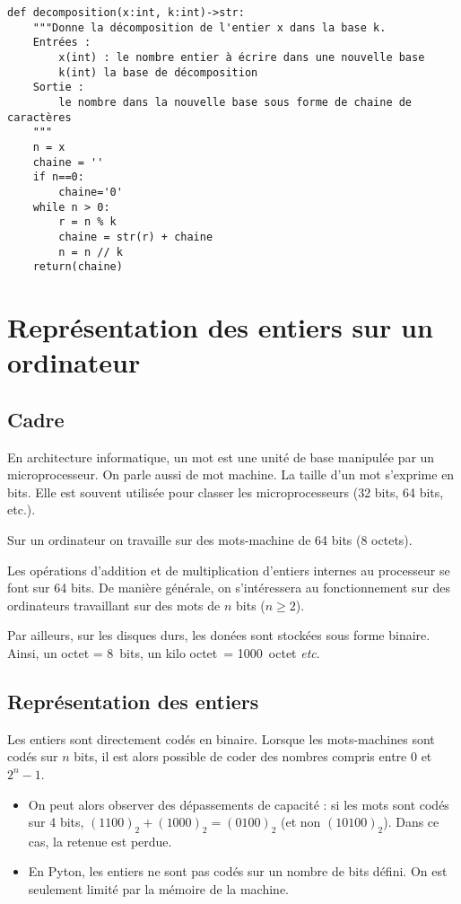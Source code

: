 \begin{lstlisting}
def decomposition(x:int, k:int)->str:
    """Donne la décomposition de l'entier x dans la base k.
    Entrées :
        x(int) : le nombre entier à écrire dans une nouvelle base
        k(int) la base de décomposition
    Sortie :
        le nombre dans la nouvelle base sous forme de chaine de caractères
    """
    n = x
    chaine = ''
    if n==0:
        chaine='0'
    while n > 0:
        r = n % k
        chaine = str(r) + chaine
        n = n // k
    return(chaine)
\end{lstlisting}

\section{Représentation des entiers sur un ordinateur}
\subsection{Cadre}
\begin{defi}
En architecture informatique, un mot est une unité de base manipulée par un microprocesseur. On parle aussi de mot machine. La taille d’un mot s’exprime en bits. Elle est souvent utilisée pour classer les microprocesseurs (32 bits, 64 bits, etc.).
\end{defi}

Sur un ordinateur on travaille sur des mots-machine de 64 bits (8 octets).

Les opérations d’addition et de multiplication d’entiers internes au processeur se font sur 64 bits.
De manière générale, on s’intéressera au fonctionnement sur des ordinateurs travaillant sur des mots de $n$ bits
($n \geq 2$).


Par ailleurs, sur les disques durs, les donées sont stockées sous forme binaire. Ainsi, 
un octet = \SI{8}{bits}, un kilo octet~= \SI{1000}{octet} \textit{etc}.


\subsection{Représentation des entiers}
Les entiers sont directement codés en binaire. Lorsque les mots-machines sont codés sur $n$ bits, il est alors possible de coder des nombres compris entre 0 et $2^n-1$.
\begin{remarque}
\begin{itemize}
\item On peut alors observer des dépassements de capacité : si les mots sont codés sur 4 bits, $(1100)_2 + (1000)_2 = (0100)_2$ (et non $(10100)_2$). Dans ce cas, la retenue est perdue. 
\item En Pyton, les entiers ne sont pas codés sur un nombre de bits défini. On est seulement limité par la mémoire de la machine.
\end{itemize}
\end{remarque}

